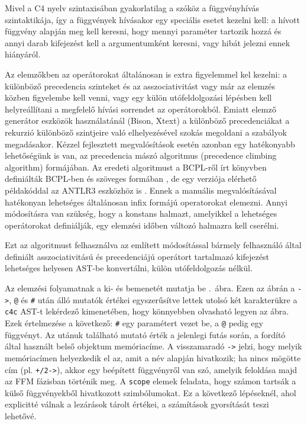 Mivel a C4 nyelv szintaxisában gyakorlatilag a szóköz a függvényhívás szintaktikája, így a függvények hívásakor egy speciális esetet kezelni kell: a hívott függvény alapján meg kell keresni, hogy mennyi paraméter tartozik hozzá és annyi darab kifejezést kell a argumentumként keresni, vagy hibát jelezni ennek hiányáról.

Az elemzőkben az operátorokat általánosan is extra figyelemmel kel kezelni: a különböző precedencia szinteket és az asszociativitást vagy már az elemzés közben figyelembe kell venni, vagy egy külön utófeldolgozási lépésben kell helyreállítani a megfelelő hívási sorrendet az operátorokból.
Emiatt elemző generátor eszközök használatánál (\pl Bison, Xtext) a különböző precedenciákat a rekurzió különböző szintjeire való elhelyezésével szokás megoldani a szabályok megadásakor.
Kézzel fejlesztett megvalósítások esetén azonban egy hatékonyabb lehetőségünk is van, az \un precedencia mászó algoritmus (precedence climbing algorithm) formájában.
Az eredeti algoritmust a BCPL-ről írt könyvben definiálták BCPL-ben és szöveges formában \cite{richardsBasicCombinedProgramming1984}, de egy verziója elérhető példakóddal az ANTLR3 eszközhöz is \cite{harwellOperatorPrecedenceParser2008}.
Ennek a manuális megvalósításával hatékonyan lehetséges általánosan infix formájú operatorokat elemezni.
Annyi módosításra van szükség, hogy a konstans halmazt, amelyikkel a lehetséges operátorokat definiálják, egy elemzési időben változó halmazra kell cserélni.

Ezt az algoritmust felhasználva az említett módosítással bármely felhasználó által definiált asszociativitású és precedenciájú operátort tartalmazó kifejezést lehetséges helyesen \gls{AST}-be konvertálni, külön utófeldolgozás nélkül.

Az elemzési folyamatnak a ki- és bemenetét mutatja be .~ábra.
Ezen az ábrán a {\tt ->}, {\tt @} és {\tt \#} után álló mutatók értékei egyszerűsítve lettek utolsó két karakterükre a {\tt c4c} \gls{AST}-t lekérdező kimenetében, hogy könnyebben olvasható legyen az ábra.
Ezek értelmezése a következő: {\tt \#} egy paramétert vezet be, a {\tt @} pedig egy függvényt.
Az utánuk található mutató érték a jelenlegi futás során, a fordító által használt belső objektum memóriacíme. 
A visszamaradó {\tt ->} jelzi, hogy melyik memóriacímen helyezkedik el az, amit a név alapján hivatkozik; ha nincs mögötte cím (pl. {\tt +/2->}), akkor egy beépített függvényről van szó, amelyik feloldása majd az \gls{FFM} fázisban történik meg. 
A {\tt scope} elemek feladata, hogy számon tartsák a külső függvényekből hivatkozott szimbólumokat. 
Ez a következő lépéseknél, ahol explicitté válnak a lezárások tárolt értékei, a számítások gyorsítását teszi lehetővé.

